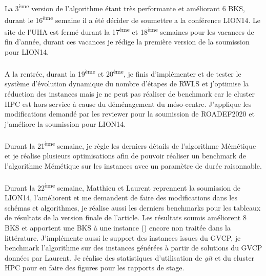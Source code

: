 \documentclass[a4paper,11pt,twoside,french,report]{../common/simplem}
\begin{document}
				\paragraph*{}
					La 3\textsuperscript{ème} version de l'algorithme étant très performante et améliorant 6 \gls{BKS}, durant le 16\textsuperscript{ème} semaine il a été décider de soumettre a la conférence \acrshort{LION14}. Le site de l'\gls{UHA} est fermé durant la 17\textsuperscript{ème} et 18\textsuperscript{ème} semaines pour les vacances de fin d'année, durant ces vacances je rédige la première version de la soumission pour \acrshort{LION14}.
				\paragraph*{}
					A la rentrée, durant la 19\textsuperscript{ème} et 20\textsuperscript{ème}, je finis d'implémenter et de tester le système d'évolution dynamique du nombre d'étapes de \gls{RWLS} et j'optimise la réduction des instances mais je ne peut pas réaliser de benchmark car le cluster \gls{HPC} est hors service à cause du déménagement du méso-centre. J'applique les modifications demandé par les reviewer pour la soumission de \acrshort{ROADEF2020} et j'améliore la soumission pour \acrshort{LION14}.
				\paragraph*{}
					Durant la 21\textsuperscript{ème} semaine, je règle les derniers détails de l'algorithme Mémétique et je réalise plusieurs optimisations afin de pouvoir réaliser un benchmark de l'algorithme Mémétique sur les instances  avec un paramètre de durée raisonnable.
				\paragraph*{}
					Durant la 22\textsuperscript{ème} semaine, Matthieu et Laurent reprennent la soumission de \acrshort{LION14}, l'améliorent et me demandent de faire des modifications dans les schémas et algorithmes, je réalise aussi les derniers benchmarks pour les tableaux de résultats de la version finale de l'article. Les résultats soumis améliorent 8 \gls{BKS} et apportent une \gls{BKS} à une instance () encore non traitée dans la littérature. J'implémente aussi le support des instances issues du \gls{GVCP}, je benchmark l'algorithme sur des instances générées à partir de solutions du \gls{GVCP} données par Laurent. Je réalise des statistiques d'utilisation de \textit{git} et du cluster \gls{HPC} pour en faire des figures pour les rapports de stage.
\end{document}
